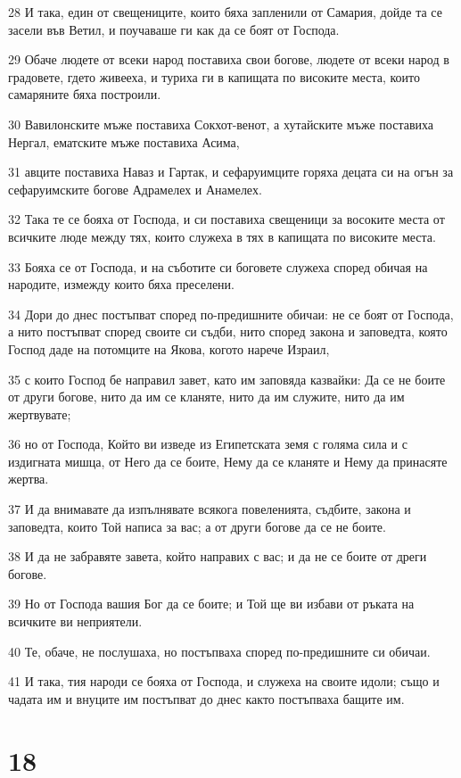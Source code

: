 \par 28 И така, един от свещениците, които бяха запленили от Самария, дойде та се засели във Ветил, и поучаваше ги как да се боят от Господа.
\par 29 Обаче людете от всеки народ поставиха свои богове, людете от всеки народ в градовете, гдето живееха, и туриха ги в капищата по високите места, които самаряните бяха построили.
\par 30 Вавилонските мъже поставиха Сокхот-венот, а хутайските мъже поставиха Нергал, ематските мъже поставиха Асима,
\par 31 авците поставиха Наваз и Гартак, и сефаруимците горяха децата си на огън за сефаруимските богове Адрамелех и Анамелех.
\par 32 Така те се бояха от Господа, и си поставиха свещеници за восоките места от всичките люде между тях, които служеха в тях в капищата по високите места.
\par 33 Бояха се от Господа, и на съботите си боговете служеха според обичая на народите, измежду които бяха преселени.
\par 34 Дори до днес постъпват според по-предишните обичаи: не се боят от Господа, а нито постъпват според своите си съдби, нито според закона и заповедта, която Господ даде на потомците на Якова, когото нарече Израил,
\par 35 с които Господ бе направил завет, като им заповяда казвайки: Да се не боите от други богове, нито да им се кланяте, нито да им служите, нито да им жертвувате;
\par 36 но от Господа, Който ви изведе из Египетската земя с голяма сила и с издигната мишца, от Него да се боите, Нему да се кланяте и Нему да принасяте жертва.
\par 37 И да внимавате да изпълнявате всякога повеленията, съдбите, закона и заповедта, които Той написа за вас; а от други богове да се не боите.
\par 38 И да не забравяте завета, който направих с вас; и да не се боите от дреги богове.
\par 39 Но от Господа вашия Бог да се боите; и Той ще ви избави от ръката на всичките ви неприятели.
\par 40 Те, обаче, не послушаха, но постъпваха според по-предишните си обичаи.
\par 41 И така, тия народи се бояха от Господа, и служеха на своите идоли; също и чадата им и внуците им постъпват до днес както постъпваха бащите им.

\chapter{18}

